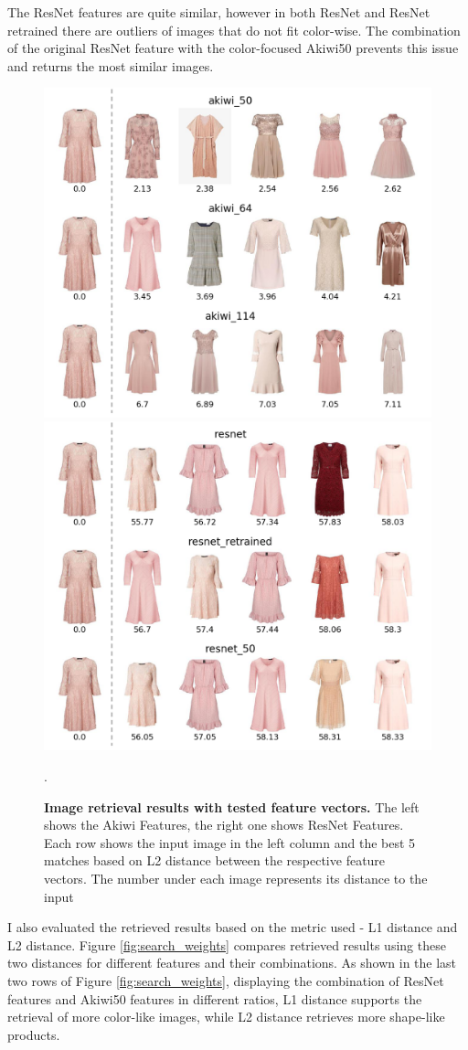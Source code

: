 \documentclass[12pt]{report}
\begin{document}
The ResNet features are quite similar, however in both ResNet and ResNet retrained there are outliers of images that do not fit color-wise. The combination of the original ResNet feature with the color-focused Akiwi50 prevents this issue and returns the most similar images.

\begin{figure}[h]
\centering
{\includegraphics[width=.48\linewidth]{04_experiments/retrieval/akiwi_pink}}\hspace{0.2cm}
{\includegraphics[width=.48\linewidth]{04_experiments/retrieval/resnet_pink}}
\caption{\label{fig:search_pink} \textbf{Image retrieval results with tested feature vectors.} The left shows the Akiwi Features, the right one shows ResNet Features. Each row shows the input image in the left column and the best 5 matches based on L2 distance between the respective feature vectors. The number under each image represents its distance to the input}.
\end{figure}

\pagebreak
I also evaluated the retrieved results based on the metric used - L1 distance and L2 distance. Figure \ref{fig:search_weights} compares retrieved results  using these two distances for different features and their combinations. As shown in the last two rows of Figure \ref{fig:search_weights}, displaying the combination of ResNet features and Akiwi50 features in different ratios, L1 distance supports the retrieval of more color-like images, while L2 distance retrieves more shape-like products. 
\end{document}
